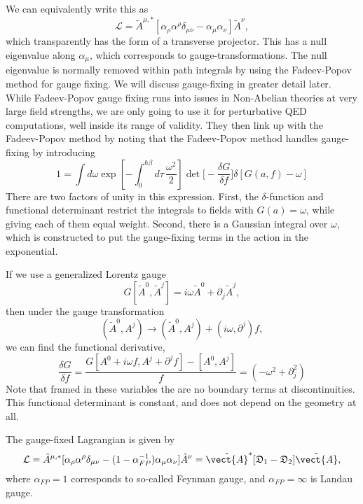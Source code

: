 We can equivalently write this as 
\begin{equation}
  \mathcal{L}=\tilde{A}^{\mu,*} [\alpha_\rho\alpha^\rho\delta_{\mu\nu} - \alpha_\mu\alpha_\nu]\tilde{A}^\nu,
\end{equation}
which transparently has the form of a transverse projector.  
This has a null eigenvalue along $\alpha_\mu$, which corresponds to gauge-transformations.  
The null eigenvalue is normally removed within path integrals by using the Fadeev-Popov method for gauge fixing. 
We will discuss gauge-fixing in greater detail later.  
While Fadeev-Popov gauge fixing runs into issues in Non-Abelian theories at very large field strengths,
we are only going to use it for perturbative QED computations, well inside its range of validity.
They then link up with the Fadeev-Popov method by noting that the Fadeev-Popov method handles gauge-fixing by introducing 
\begin{equation}
  1 = \int d\omega \exp\left[-\int_0^{\hbar\beta}d\tau\,\frac{\omega^2}{2} \right]
  \det\bigg[-\frac{\delta G}{\delta f}\bigg]\delta[G(a,f)-\omega]
\end{equation}
There are two factors of unity in this expression.  First, the $\delta$-function and functional
 determinant restrict the integrals to fields with $G(a)=\omega$, while giving each of them equal weight.
Second, there is a Gaussian integral over $\omega$, which is constructed to put the gauge-fixing 
terms in the action in the exponential.

If we use a generalized Lorentz gauge 
\begin{equation}
  G[\tilde{A}^0,\tilde{A}^j] = i\omega \tilde{A}^0 + \partial_j \tilde{A}^j,
\end{equation}
then under the gauge transformation
\begin{equation}
  (\tilde{A}^0,A^j)\rightarrow  (\tilde{A}^0,A^j) + (i\omega,\partial^j)f,
\end{equation}
we can find the functional derivative, 
\begin{equation}
  \frac{\delta G}{\delta f} = \frac{G[A^0+i\omega f,A^j+\partial^jf]  -[A^0,A^j]}{f}
  = (-\omega^2 +\partial_j^2)
\end{equation}
Note that framed in these variables the are no boundary terms at discontinuities.  
This functional determinant is constant, and does not depend on the geometry at all.  

The gauge-fixed Lagrangian is given by
\begin{equation}
  \mathcal{L}=\tilde{A}^{\mu,*} [\alpha_\rho\alpha^\rho\delta_{\mu\nu}
  -(1-\alpha^{-1}_{FP})\alpha_\mu\alpha_\nu]\tilde{A}^\nu
=\tilde{\vect{A}}^{*}[\mathfrak{D}_1-\mathfrak{D}_2]\tilde{\vect{A}},
\end{equation}
where $\alpha_{FP}=1$ corresponds to so-called Feynman gauge, and $\alpha_{FP}=\infty$ is Landau gauge.

